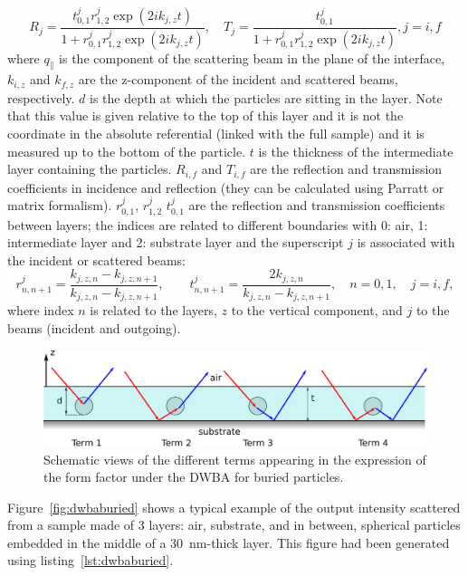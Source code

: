 \begin{equation*}
R_j =\frac{t^{j}_{0,1}r^{j}_{1,2}\exp(2ik_{j,z}t)}{1+r^{j}_{0,1}r^{j}_{1,2}\exp(2ik_{j,z}t)}, \quad T_j=\frac{t^{j}_{0,1}}{1+r^{j}_{0,1}r^{j}_{1,2}\exp(2ik_{j,z}t)}, j=i,f 
\end{equation*}
where $q_{\parallel}$ is the component of the scattering beam in the plane of the interface, $k_{i,z}$ and $k_{f,z}$ are the z-component of the incident and scattered beams, respectively.  $d$ is the depth at which the particles are sitting in the layer. Note that this value is given relative to the top of this layer and it is not the coordinate in the absolute referential (linked with the full sample) and it is measured up to the bottom of the particle. $t$ is the thickness of the intermediate layer containing the particles. $R_{i,f}$ and $T_{i,f}$  are the reflection  and transmission coefficients in incidence and reflection (they can be calculated using Parratt or matrix formalism). $r^j_{0,1}$, $r^j_{1,2}$ $t^j_{0,1}$ are the reflection and transmission coefficients between layers; the indices are related to different boundaries with 0: air, 1: intermediate layer and 2: substrate layer and the superscript $j$ is associated with the incident or scattered beams:
\begin{equation*}
r^j_{n,n+1}=\frac{k_{j,z,n}-k_{j,z,n+1}}{k_{j,z,n}-k_{j,z,n+1}}, \qquad t^j_{n,n+1}= \frac{2k_{j,z,n}}{k_{j,z,n}-k_{j,z,n+1}}, \quad n=0,1, \quad j=i,f,
\end{equation*}
where index $n$ is related to the layers, $z$ to the vertical component, and $j$ to the beams (incident and outgoing).

\begin{figure}[ht]
\begin{center}
\includegraphics[width=\textwidth]{fig/drawing/drawingDWBAburied.pdf}
\end{center}
\caption{Schematic views of the different terms appearing in the expression of the form factor under the DWBA for buried particles.}
\label{fig:SchemDWBAburied}
\end{figure}


Figure~\ref{fig:dwbaburied} shows a typical example of the output intensity scattered from a sample made of 3 layers: air, substrate, and in between, spherical particles embedded in the middle of a 30~nm-thick layer. This figure had been generated using listing~\ref{lst:dwbaburied}.

